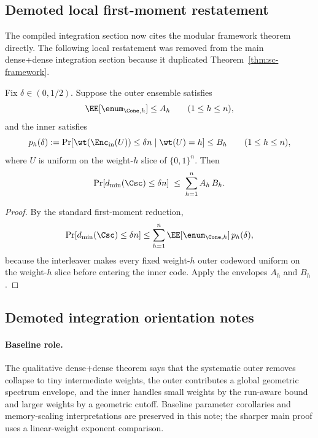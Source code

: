 
\subsection{Demoted local first-moment restatement}

The compiled integration section now cites the modular framework theorem directly.  The following local restatement was
removed from the main dense+dense integration section because it duplicated Theorem~\ref{thm:sc-framework}.

\begin{theorem}
\label{thm:dense-dense-direct-first-moment}
Fix \(\delta\in(0,1/2)\).
Suppose the outer ensemble satisfies
\[
\EE[\enum_{\Cone,h}] \le A_h
\qquad (1\le h\le n),
\]
and the inner satisfies
\[
p_h(\delta)
:=
\Pr[\wt(\Enc_{\mathrm{in}}(U))\le \delta n\mid \wt(U)=h]
\le B_h
\qquad (1\le h\le n),
\]
where \(U\) is uniform on the weight-\(h\) slice of \(\{0,1\}^n\).
Then
\begin{equation}
\label{eq:dense-dense-direct-first-moment}
\Pr[d_{\min}(\Csc)\le \delta n]
\;\le\;
\sum_{h=1}^{n} A_h\,B_h.
\end{equation}
\end{theorem}

\begin{proof}
By the standard first-moment reduction,
\[
\Pr[d_{\min}(\Csc)\le \delta n]
\le
\sum_{h=1}^{n}\EE[\enum_{\Cone,h}]\,p_h(\delta),
\]
because the interleaver makes every fixed weight-\(h\) outer codeword uniform on the weight-\(h\) slice before entering
the inner code. Apply the envelopes \(A_h\) and \(B_h\).
\end{proof}

\subsection{Demoted integration orientation notes}

\paragraph{Baseline role.}
The qualitative dense+dense theorem says that the systematic outer removes collapse to tiny intermediate weights, the
outer contributes a global geometric spectrum envelope, and the inner handles small weights by the run-aware bound and
larger weights by a geometric cutoff.  Baseline parameter corollaries and memory-scaling interpretations are preserved
in this note; the sharper main proof uses a linear-weight exponent comparison.

